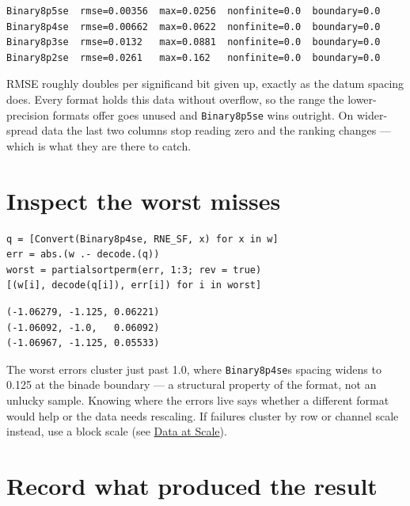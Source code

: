 \begin{verbatim}
Binary8p5se  rmse=0.00356  max=0.0256  nonfinite=0.0  boundary=0.0
Binary8p4se  rmse=0.00662  max=0.0622  nonfinite=0.0  boundary=0.0
Binary8p3se  rmse=0.0132   max=0.0881  nonfinite=0.0  boundary=0.0
Binary8p2se  rmse=0.0261   max=0.162   nonfinite=0.0  boundary=0.0
\end{verbatim}



RMSE roughly doubles per significand bit given up, exactly as the datum spacing does. Every format holds this data without overflow, so the range the lower-precision formats offer goes unused and \texttt{Binary8p5se} wins outright. On wider-spread data the last two columns stop reading zero and the ranking changes — which is what they are there to catch.



\section{Inspect the worst misses}



\label{18179706212253785775}{}



\begin{verbatim}
q = [Convert(Binary8p4se, RNE_SF, x) for x in w]
err = abs.(w .- decode.(q))
worst = partialsortperm(err, 1:3; rev = true)
[(w[i], decode(q[i]), err[i]) for i in worst]
\end{verbatim}




\begin{verbatim}
(-1.06279, -1.125, 0.06221)
(-1.06092, -1.0,   0.06092)
(-1.06967, -1.125, 0.05533)
\end{verbatim}



The worst errors cluster just past 1.0, where \texttt{Binary8p4se}{\textquotesingle}s spacing widens to 0.125 at the binade boundary — a structural property of the format, not an unlucky sample. Knowing where the errors live says whether a different format would help or the data needs rescaling. If failures cluster by row or channel scale instead, use a block scale (see \href{data.md}{Data at Scale}).



\section{Record what produced the result}



